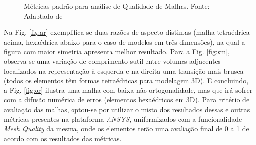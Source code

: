 \begin{figure}[H]
\centering
{}\hfill
{}\par 
{}
\caption{Métricas-padrão para análise de Qualidade de Malhas. Fonte: Adaptado de \cite{luiz_malha}}
\label{fig:mesh}
\end{figure}

 Na Fig. \ref{fig:ar} exemplifica-se duas razões de aspecto distintas (malha tetraédrica acima, hexaédrica abaixo para o caso de modelos em três dimensões), na qual a figura com maior simetria apresenta melhor resultado. Para a Fig. \ref{fig:sm}, 
observa-se uma variação de comprimento sutil entre volumes adjacentes localizados na representação à esquerda e na direita uma transição mais brusca (todos os elementos têm formas tetraédricas para modelagem 3D). E concluindo, a Fig. \ref{fig:or} ilustra uma malha com baixa não-ortogonalidade, mas que irá sofrer com a difusão numérica de erros (elementos hexaédricos em 3D).  
Para critério de avaliação das malhas, optou-se por utilizar o misto dos resultados dessas e outras métricas presentes na plataforma \textit{ANSYS}, uniformizados com a funcionalidade \textit{Mesh Quality} da mesma, onde os elementos terão uma avaliação final de 0 a 1 de acordo com os resultados das métricas.

